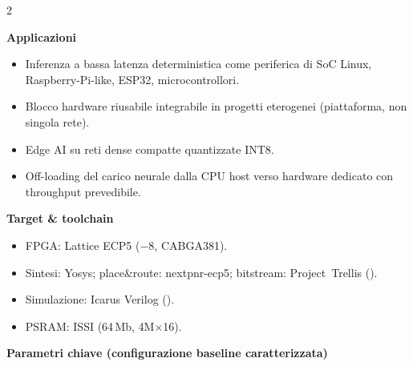 \begin{multicols}{2}
\columnbreak

{\color{fnDark}\large\bfseries Applicazioni}\\[2pt]
{\footnotesize
\begin{itemize}[leftmargin=1.1em]
\item Inferenza a bassa latenza deterministica come periferica di
      SoC Linux, Raspberry-Pi-like, ESP32, microcontrollori.
\item Blocco hardware riusabile integrabile in progetti eterogenei
      (piattaforma, non singola rete).
\item Edge AI su reti dense compatte quantizzate INT8.
\item Off-loading del carico neurale dalla CPU host verso hardware
      dedicato con throughput prevedibile.
\end{itemize}}

\vspace{4pt}
{\color{fnDark}\large\bfseries Target \& toolchain}\\[2pt]
{\footnotesize
\begin{itemize}[leftmargin=1.1em]
\item FPGA: Lattice ECP5  ($-8$, CABGA381).
\item Sintesi: Yosys; place\&route: nextpnr-ecp5; bitstream: Project~Trellis
      ().
\item Simulazione: Icarus Verilog ().
\item PSRAM: ISSI  (64\,Mb, 4M$\times$16).
\end{itemize}}
\end{multicols}

\vspace{2pt}
\noindent
{\small\color{fnDark}\bfseries Parametri chiave (configurazione baseline caratterizzata)}
\vspace{2pt}

